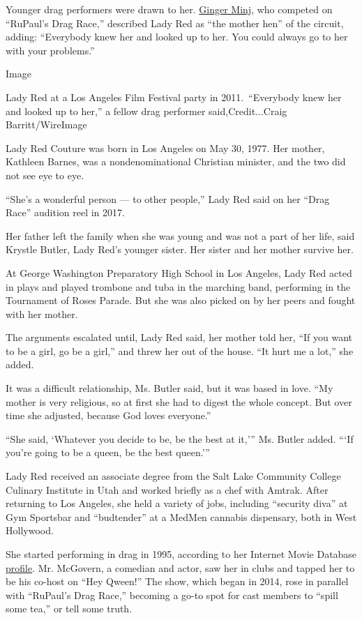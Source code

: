 Younger drag performers were drawn to her.
\href{https://gingerminj.com/}{Ginger Minj}, who competed on ``RuPaul's
Drag Race,'' described Lady Red as ``the mother hen'' of the circuit,
adding: ``Everybody knew her and looked up to her. You could always go
to her with your problems.''

Image

Lady Red at a Los Angeles Film Festival party in 2011.~``Everybody knew
her and looked up to her,'' a fellow drag performer said,Credit...Craig
Barritt/WireImage

Lady Red Couture was born in Los Angeles on May 30, 1977. Her mother,
Kathleen Barnes, was a nondenominational Christian minister, and the two
did not see eye to eye.

``She's a wonderful person --- to other people,'' Lady Red said on her
``Drag Race'' audition reel in 2017.

Her father left the family when she was young and was not a part of her
life, said Krystle Butler, Lady Red's younger sister. Her sister and her
mother survive her.

At George Washington Preparatory High School in Los Angeles, Lady Red
acted in plays and played trombone and tuba in the marching band,
performing in the Tournament of Roses Parade. But she was also picked on
by her peers and fought with her mother.

The arguments escalated until, Lady Red said, her mother told her, ``If
you want to be a girl, go be a girl,'' and threw her out of the house.
``It hurt me a lot,'' she added.

It was a difficult relationship, Ms. Butler said, but it was based in
love. ``My mother is very religious, so at first she had to digest the
whole concept. But over time she adjusted, because God loves everyone.''

``She said, `Whatever you decide to be, be the best at it,''' Ms. Butler
added. ```If you're going to be a queen, be the best queen.'''

Lady Red received an associate degree from the Salt Lake Community
College Culinary Institute in Utah and worked briefly as a chef with
Amtrak. After returning to Los Angeles, she held a variety of jobs,
including ``security diva'' at Gym Sportsbar and ``budtender'' at a
MedMen cannabis dispensary, both in West Hollywood.

She started performing in drag in 1995, according to her Internet Movie
Database
\href{https://www.imdb.com/name/nm4366207/bio?ref_=nm_ov_bio_sm}{profile}.
Mr. McGovern, a comedian and actor, saw her in clubs and tapped her to
be his co-host on ``Hey Qween!'' The show, which began in 2014, rose in
parallel with ``RuPaul's Drag Race,'' becoming a go-to spot for cast
members to ``spill some tea,'' or tell some truth.

